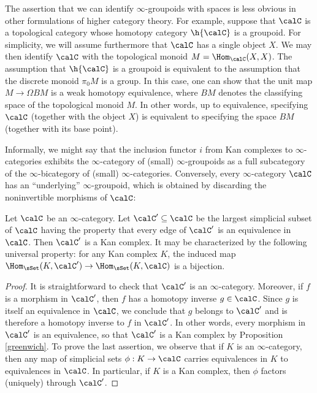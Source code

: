 \begin{remark}
The assertion that we can identify $\infty$-groupoids with spaces is less obvious in other formulations of higher category theory. For example, suppose that $\calC$ is a topological category whose homotopy category $\h{\calC}$ is a groupoid. For simplicity, we will assume furthermore that $\calC$ has a single object $X$. We may then identify $\calC$ with
the topological monoid $M=\Hom_{\calC}(X,X)$. The assumption that
$\h{ \calC}$ is a groupoid is equivalent to the assumption
that the discrete monoid $\pi_0 M$ is a group. In this case, one can show that the 
unit map $M \rightarrow \Omega BM$ is a weak homotopy
equivalence, where $BM$ denotes the classifying space of the
topological monoid $M$. In other words, up to equivalence,
specifying $\calC$ (together with the object $X$) is equivalent to
specifying the space $BM$ (together with its base point).
\end{remark}

Informally, we might say that the inclusion functor $i$ from Kan
complexes to $\infty$-categories exhibits the $\infty$-category of
(small) $\infty$-groupoids as a full subcategory of
the $\infty$-bicategory of (small) $\infty$-categories. Conversely, every
$\infty$-category $\calC$ has an ``underlying'' $\infty$-groupoid, which is obtained by discarding the noninvertible morphisms of $\calC$:

\begin{proposition}\label{lumba}
Let $\calC$ be an $\infty$-category. Let $\calC' \subseteq \calC$ be the largest simplicial
subset of $\calC$ having the property that every edge of $\calC'$ is an equivalence in $\calC$.
Then $\calC'$ is a Kan complex. It may be characterized by the
following universal property: for any Kan complex $K$, the induced
map $\Hom_{\sSet}(K,\calC') \rightarrow \Hom_{\sSet}(K,\calC)$ is a
bijection.
\end{proposition}

\begin{proof}
It is straightforward to check that $\calC'$ is an $\infty$-category. Moreover, if
$f$ is a morphism in $\calC'$, then $f$ has a homotopy inverse $g \in \calC$. Since
$g$ is itself an equivalence in $\calC$, we conclude that $g$ belongs to $\calC'$ and
is therefore a homotopy inverse to $f$ in $\calC'$. In other words, every morphism in $\calC'$ is an equivalence, so that $\calC'$ is a Kan complex by Proposition \ref{greenwich}. To prove the last assertion, we observe that if $K$ is an $\infty$-category, then any map of simplicial sets
$\phi: K \rightarrow \calC$ carries equivalences in $K$ to equivalences in $\calC$. In particular, if
$K$ is a Kan complex, then $\phi$ factors (uniquely) through $\calC'$.
\end{proof}

